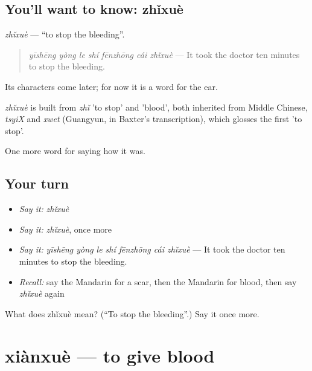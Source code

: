 \subsection*{You'll want to know: zhǐxuè}
\emph{zhǐxuè} — \textquotedblleft{}to stop the bleeding\textquotedblright{}.

\begin{quote}
\emph{yīshēng yòng le shí fēnzhōng cái zhǐxuè} — It took the doctor ten minutes to stop the bleeding.
\end{quote}

Its characters come later; for now it is a word for the ear.

\begin{cousinweb}
\emph{zhǐxuè} is built from \emph{zhǐ} 'to stop' and  'blood', both inherited from Middle Chinese, \emph{tsyiX} and \emph{xwet} (Guangyun, in Baxter's transcription), which glosses the first 'to stop'.
\end{cousinweb}

\begin{grammarlens}[title={What you've built}]
One more word for saying how it was.
\end{grammarlens}

\subsection*{Your turn}
\begin{itemize}
\raggedright
  \item \emph{Say it:} \emph{zhǐxuè}
  \item \emph{Say it:} \emph{zhǐxuè}, once more
  \item \emph{Say it:} \emph{yīshēng yòng le shí fēnzhōng cái zhǐxuè} — It took the doctor ten minutes to stop the bleeding.
  \item \emph{Recall:} say the Mandarin for a scar, then the Mandarin for blood, then say \emph{zhǐxuè} again
\end{itemize}

\begin{tcolorbox}[breakable,colback=teal!4,colframe=teal!35!black,title={Before you move on}]
What does zhǐxuè mean? (\textquotedblleft{}To stop the bleeding\textquotedblright{}.) Say it once more.
\end{tcolorbox}
\section[xiànxuè]{xiànxuè — to give blood}

